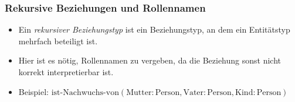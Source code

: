 \documentclass[a4paper, 11pt, accentcolor = tud3b]{tudreport}
\begin{document}
                \subsubsection{Rekursive Beziehungen und Rollennamen} %
                    \begin{itemize}
                    	\item Ein \textit{rekursiver Beziehungstyp} ist ein Beziehungstyp, an dem ein Entitätstyp mehrfach beteiligt ist.
                    	\item Hier ist es nötig, Rollennamen zu vergeben, da die Beziehung sonst nicht korrekt interpretierbar ist.
                    	\item Beispiel: \( \text{ist-Nachwuchs-von}(\text{Mutter}: \text{Person}, \text{Vater}: \text{Person}, \text{Kind}: \text{Person}) \)
                    \end{itemize}
                	\begin{figure}[H]
                		\centering
                	\end{figure}
\end{document}
